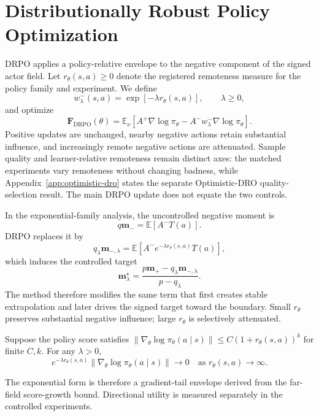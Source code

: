 \section{Distributionally Robust Policy Optimization}
\label{sec:method}

DRPO applies a policy-relative envelope to the negative component of the signed actor field. Let $r_\theta(s,a)\ge 0$ denote the registered remoteness measure for the policy family and experiment. We define
\begin{equation}
w^-_\lambda(s,a)=\exp[-\lambda r_\theta(s,a)],\qquad \lambda\ge 0,
\label{eq:exp-weight}
\end{equation}
and optimize
\begin{equation}
\mathbf F_{\mathrm{DRPO}}(\theta)=\mathbb E_\nu\!\left[A^+\nabla\log\pi_\theta-A^-w^-_\lambda\nabla\log\pi_\theta\right].
\label{eq:drpo-field}
\end{equation}
Positive updates are unchanged, nearby negative actions retain substantial influence, and increasingly remote negative actions are attenuated. Sample quality and learner-relative remoteness remain distinct axes: the matched experiments vary remoteness without changing badness, while Appendix~\ref{app:optimistic-dro} states the separate Optimistic-DRO quality-selection result. The main DRPO update does not equate the two controls.

In the exponential-family analysis, the uncontrolled negative moment is
\begin{equation}
q\mathbf m_-=\mathbb E[A^-T(a)].
\end{equation}
DRPO replaces it by
\begin{equation}
q_\lambda\mathbf m_{-,\lambda}=\mathbb E[A^-e^{-\lambda r_\theta(s,a)}T(a)],
\label{eq:weighted-negative-moment}
\end{equation}
which induces the controlled target
\begin{equation}
\mathbf m_\lambda^\star=\frac{p\mathbf m_+-q_\lambda\mathbf m_{-,\lambda}}{p-q_\lambda}.
\end{equation}
The method therefore modifies the same term that first creates stable extrapolation and later drives the signed target toward the boundary. Small $r_\theta$ preserves substantial negative influence; large $r_\theta$ is selectively attenuated.

\begin{proposition}
\label{prop:vanishing}
Suppose the policy score satisfies $\|\nabla_\theta\log\pi_\theta(a\mid s)\|\le C(1+r_\theta(s,a))^k$ for finite $C,k$. For any $\lambda>0$,
\begin{equation}
e^{-\lambda r_\theta(s,a)}\|\nabla_\theta\log\pi_\theta(a\mid s)\|\rightarrow 0
\quad\text{as }r_\theta(s,a)\rightarrow\infty.
\end{equation}
\end{proposition}
The exponential form is therefore a gradient-tail envelope derived from the far-field score-growth bound. Directional utility is measured separately in the controlled experiments.

